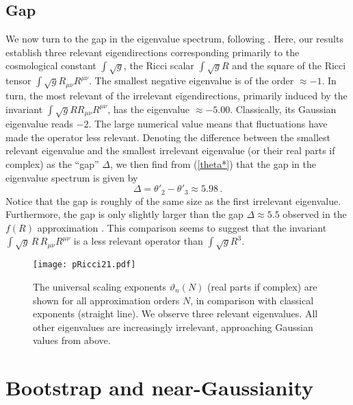 \documentclass[notitlepage,eqsecnum,bm,amsmath,preprintnumbers,superscriptaddress,nofootinbib,aps,11pt]{revtex4-1}
\def\eq#1{(\ref{#1})}
\begin{document}
\subsection{Gap}
We now turn to the gap in the eigenvalue spectrum, following \cite{Falls:2014tra}. Here, our results establish three relevant eigendirections corresponding primarily to the cosmological constant $\int\sqrt{g}$, the Ricci scalar $\int\sqrt{g}R$ and the square of the Ricci tensor $\int\sqrt{g}R_{\mu\nu} R^{\mu\nu}$. The smallest 
negative eigenvalue is of the order  $\approx -1$. In turn, the most relevant of the irrelevant eigendirections, primarily 
induced by the invariant $\int\sqrt{g}R R_{\mu\nu} R^{\mu\nu}$, has the 
eigenvalue $\approx -5.00$. Classically, its Gaussian eigenvalue reads $-2$. The large numerical value means that fluctuations have made
the operator less relevant. Denoting  the difference between the smallest relevant eigenvalue and 
the smallest irrelevant eigenvalue (or their real parts if complex) as the ``gap'' $\Delta$, we then find from \eq{theta*} that the gap in the 
eigenvalue spectrum is given by 
\begin{equation}
\Delta=\theta'_2-\theta'_3\approx 5.98\,.
\end{equation}
Notice that the gap is roughly of the same size as the first irrelevant eigenvalue. Furthermore, the gap is only slightly larger than the gap $\Delta\approx 5.5$ observed in the $f(R)$ approximation \cite{Falls:2013bv,Falls:2014tra}. 
This comparison seems to suggest that the invariant $\int \sqrt{g}\,R\,R_{\mu\nu}R^{\mu\nu}$ is a less relevant operator than $\int \sqrt{g}R^3$.

\begin{figure}[t]
\centering
\begin{center}
\texttt{[image: pRicci21.pdf]}
\caption{\label{pRicci21} The universal scaling exponents $\vartheta_n(N)$ (real parts if complex) are shown for all approximation orders $N$, in comparison with classical exponents (straight line). We observe three relevant eigenvalues. All other eigenvalues are increasingly irrelevant, approaching Gaussian values from above.}
\end{center}
\end{figure}

\section{\bf Bootstrap and near-Gaussianity}\label{sec:bootstrap}
\end{document}
